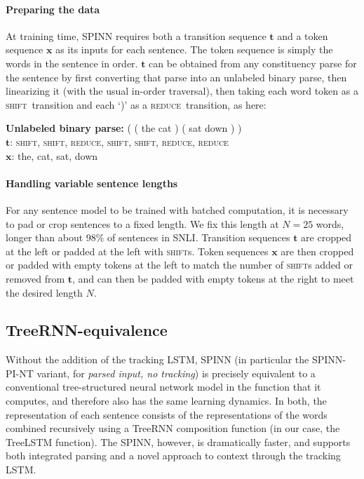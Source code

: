 \documentclass[11pt]{article}
\newcommand{\shift}{\textsc{shift}}
\newcommand{\reduce}{\textsc{reduce}}
\begin{document}
\paragraph{Preparing the data} At training time, SPINN requires both a transition sequence $\mathbf t$  and a token sequence $\mathbf x$ as its inputs for each sentence. The token sequence is simply the words in the sentence in order. $\mathbf t$ can be obtained from any constituency parse for the sentence by first converting that parse into an unlabeled binary parse, then linearizing it (with the usual in-order traversal), then taking each word token as a \shift\ transition and each `)' as a \reduce\ transition, as here:

\vspace{0.5em}
{\noindent\small
{\bf Unlabeled binary parse:} ( ( the cat ) ( sat down ) )\\
{$\mathbf t$}: \shift, \shift, \reduce, \shift, \shift, \reduce, \reduce\\
{$\mathbf x$}: the, cat, sat, down
}

\paragraph{Handling variable sentence lengths} For any sentence model to be trained with batched computation, it is necessary to pad or crop sentences to a fixed length. We fix this length at $N = 25$ words, longer than about 98\% of sentences in SNLI. Transition sequences $\mathbf t$ are cropped at the left or padded at the left with \shift s. Token sequences $\mathbf x$ are then cropped or padded with empty tokens at the left to match the number of \shift s added or removed from $\mathbf t$, and can then be padded with empty tokens at the right to meet the desired length $N$.


\subsection{TreeRNN-equivalence}

Without the addition of the tracking LSTM, SPINN (in particular the SPINN-PI-NT variant, for \textit{parsed input, no tracking}) is precisely equivalent to a conventional tree-structured neural network model in the function that it computes, and therefore also has the same learning dynamics. In both, the representation of each sentence consists of the representations of the words combined recursively using a TreeRNN composition function (in our case, the TreeLSTM function). The SPINN, however, is dramatically faster, and supports both integrated parsing and a novel approach to context through the tracking LSTM.
\end{document}
